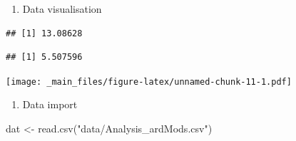 \documentclass[
]{book}
\newenvironment{Shaded}{\begin{snugshade}}{\end{snugshade}}
\newcommand{\AttributeTok}[1]{\textcolor[rgb]{0.77,0.63,0.00}{#1}}
\newcommand{\CommentTok}[1]{\textcolor[rgb]{0.56,0.35,0.01}{\textit{#1}}}
\newcommand{\ConstantTok}[1]{\textcolor[rgb]{0.00,0.00,0.00}{#1}}
\newcommand{\FunctionTok}[1]{\textcolor[rgb]{0.00,0.00,0.00}{#1}}
\newcommand{\NormalTok}[1]{#1}
\newcommand{\OtherTok}[1]{\textcolor[rgb]{0.56,0.35,0.01}{#1}}
\newcommand{\SpecialCharTok}[1]{\textcolor[rgb]{0.00,0.00,0.00}{#1}}
\newcommand{\StringTok}[1]{\textcolor[rgb]{0.31,0.60,0.02}{#1}}
\providecommand{\tightlist}{%
  \setlength{\itemsep}{0pt}\setlength{\parskip}{0pt}}
\begin{document}
\begin{enumerate}
\def\labelenumi{\arabic{enumi}.}
\setcounter{enumi}{3}
\tightlist
\item
  Data visualisation
\end{enumerate}

\begin{Shaded}
\end{Shaded}

\begin{verbatim}
## [1] 13.08628
\end{verbatim}

\begin{Shaded}
\end{Shaded}

\begin{verbatim}
## [1] 5.507596
\end{verbatim}

\begin{Shaded}
\end{Shaded}

\texttt{[image: \_main\_files/figure-latex/unnamed-chunk-11-1.pdf]}

\begin{enumerate}
\def\labelenumi{\arabic{enumi}.}
\setcounter{enumi}{2}
\tightlist
\item
  Data import
\end{enumerate}

\begin{Shaded}
\begin{Highlighting}[]
\NormalTok{dat }\OtherTok{\textless{}{-}} \FunctionTok{read.csv}\NormalTok{(}\StringTok{"data/Analysis\_ardMods.csv"}\NormalTok{)}
\end{Highlighting}
\end{Shaded}
\end{document}
